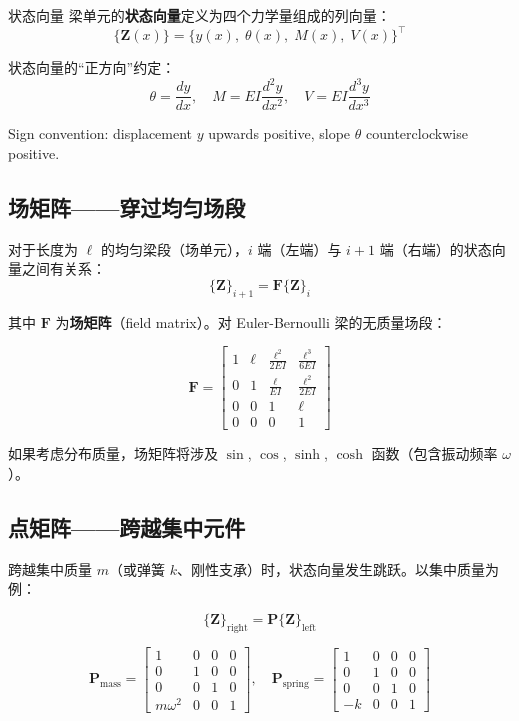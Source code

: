 \begin{mydefinition}{状态向量}
梁单元的\textbf{状态向量}定义为四个力学量组成的列向量：
\[
\{\mathbf{Z}(x)\} = \{y(x),\; \theta(x),\; M(x),\; V(x)\}^{\top}
\]
\end{mydefinition}

状态向量的``正方向''约定：
\[
\theta = \frac{dy}{dx}, \quad M = EI\frac{d^2y}{dx^2}, \quad V = EI\frac{d^3y}{dx^3}
\]

Sign convention: displacement $y$ upwards positive, slope $\theta$ counterclockwise positive.

\subsection{场矩阵——穿过均匀场段}

对于长度为 $\ell$ 的均匀梁段（场单元），$i$ 端（左端）与 $i+1$ 端（右端）的状态向量之间有关系：
\[
\{\mathbf{Z}\}_{i+1} = \mathbf{F}\{\mathbf{Z}\}_i
\]

其中 $\mathbf{F}$ 为\textbf{场矩阵}（field matrix）。对 Euler-Bernoulli 梁的无质量场段：

\begin{myformula}
\[
\mathbf{F} = \begin{bmatrix}
1 & \ell & \frac{\ell^2}{2EI} & \frac{\ell^3}{6EI} \\[4pt]
0 & 1 & \frac{\ell}{EI} & \frac{\ell^2}{2EI} \\[4pt]
0 & 0 & 1 & \ell \\[4pt]
0 & 0 & 0 & 1
\end{bmatrix}
\]
\end{myformula}

如果考虑分布质量，场矩阵将涉及 $\sin$, $\cos$, $\sinh$, $\cosh$ 函数（包含振动频率 $\omega$）。

\subsection{点矩阵——跨越集中元件}

跨越集中质量 $m$（或弹簧 $k$、刚性支承）时，状态向量发生跳跃。以集中质量为例：

\[
\{\mathbf{Z}\}_{\text{right}} = \mathbf{P}\{\mathbf{Z}\}_{\text{left}}
\]

\begin{myformula}
\[
\mathbf{P}_{\text{mass}} = \begin{bmatrix}
1 & 0 & 0 & 0 \\
0 & 1 & 0 & 0 \\
0 & 0 & 1 & 0 \\
m\omega^2 & 0 & 0 & 1
\end{bmatrix}, \quad
\mathbf{P}_{\text{spring}} = \begin{bmatrix}
1 & 0 & 0 & 0 \\
0 & 1 & 0 & 0 \\
0 & 0 & 1 & 0 \\
-k & 0 & 0 & 1
\end{bmatrix}
\]
\end{myformula}

